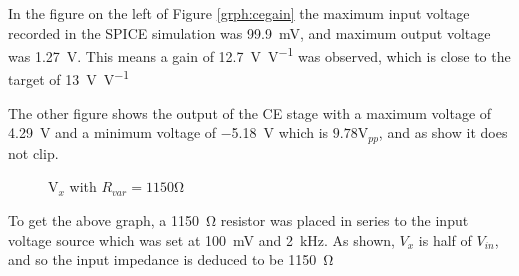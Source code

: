 \documentclass[12pt]{article}
\begin{document}
In the figure on the left of Figure \ref{grph:cegain} the maximum input voltage recorded in the SPICE simulation was \SI{99.9}{\milli\volt}, and maximum output voltage was \SI{1.27}{\volt}. This means a gain of \SI[per-mode=symbol]{12.7}{\volt\per\volt} was observed, which is close to the target of \SI[per-mode=symbol]{13}{\volt\per\volt}

The other figure shows the output of the CE stage with a maximum voltage of \SI{4.29}{\volt} and a minimum voltage of \SI{-5.18}{\volt} which is \(9.78 \si{\volt}_{pp}\), and as show it does not clip.
    \begin{figure}[H]
    \centering
    \caption{\(\si{\volt}_x\) with \(R_{var} = 1150\si{\ohm}\)}
    \label{grph:ceimpede}
    \end{figure}
    
To get the above graph, a \SI{1150}{\ohm} resistor was placed in series to the input voltage source which was set at \SI{100}{\milli\volt} and \SI{2}{\kilo\hertz}. As shown, \(V_x\) is half of \(V_{in}\), and so the input impedance is deduced to be \SI{1150}{\ohm}

\begin{figure}[H]
    \centering
\end{figure}
\end{document}
